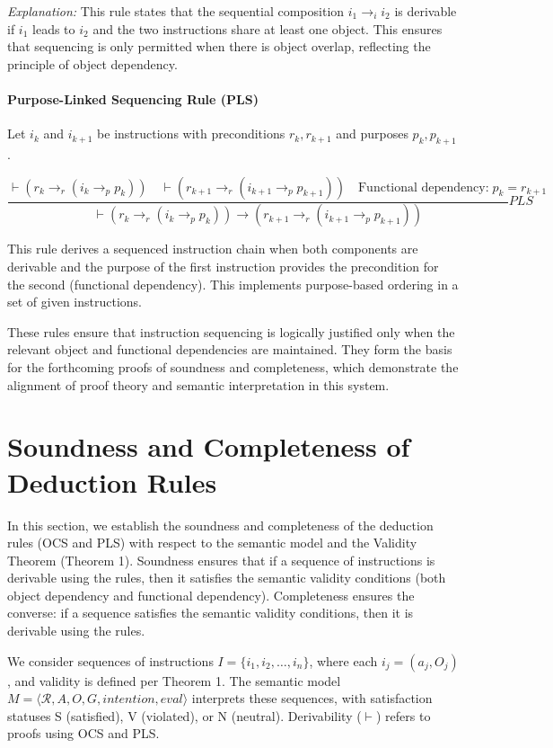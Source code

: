 \documentclass[a4paper,11pt]{lmcs}
\begin{document}
\emph{Explanation:}
This rule states that the sequential composition $i_1 \rightarrow_i i_2$ is derivable if $i_1$ leads to $i_2$ and the two instructions share at least one object. This ensures that sequencing is only permitted when there is object overlap, reflecting the principle of object dependency.

\paragraph{Purpose-Linked Sequencing Rule (PLS)}

Let $i_k$ and $i_{k+1}$ be instructions with preconditions $r_k, r_{k+1}$ and purposes $p_k, p_{k+1}$.

\[
\frac{
  \vdash (r_k \rightarrow_r (i_k \rightarrow_p p_k)) \quad
  \vdash (r_{k+1} \rightarrow_r (i_{k+1} \rightarrow_p p_{k+1})) \quad
  \text{Functional dependency:}\; p_k = r_{k+1}
}{
  \vdash (r_k \rightarrow_r (i_k \rightarrow_p p_k)) \rightarrow (r_{k+1} \rightarrow_r (i_{k+1} \rightarrow_p p_{k+1}))
}PLS
\]

This rule derives a sequenced instruction chain when both components are derivable and the purpose of the first instruction provides the precondition for the second (functional dependency). This implements purpose-based ordering in a set of given instructions.

These rules ensure that instruction sequencing is logically justified only when the relevant object and functional dependencies are maintained. They form the basis for the forthcoming proofs of soundness and completeness, which demonstrate the alignment of proof theory and semantic interpretation in this system.

\section{Soundness and Completeness of Deduction Rules}

In this section, we establish the soundness and completeness of the deduction rules (OCS and PLS) with respect to the semantic model and the Validity Theorem (Theorem 1). Soundness ensures that if a sequence of instructions is derivable using the rules, then it satisfies the semantic validity conditions (both object dependency and functional dependency). Completeness ensures the converse: if a sequence satisfies the semantic validity conditions, then it is derivable using the rules.

We consider sequences of instructions \( I = \{i_1, i_2, \dots, i_n\} \), where each \( i_j = (a_j, O_j) \), and validity is defined per Theorem 1. The semantic model \( M = \langle \mathcal{R}, A, O, G, \textit{intention}, \textit{eval} \rangle \) interprets these sequences, with satisfaction statuses S (satisfied), V (violated), or N (neutral). Derivability (\( \vdash \)) refers to proofs using OCS and PLS.
\end{document}
